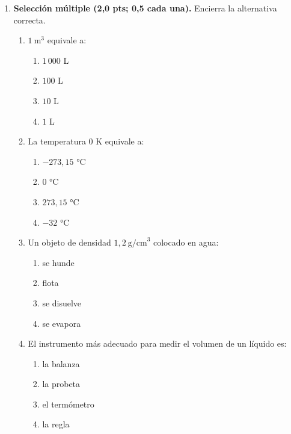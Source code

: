 \documentclass[12pt, letterpaper]{article}
\begin{document}
\begin{enumerate}[leftmargin=*, label=\textbf{\arabic*.}, itemsep=0.5em]

  \item \textbf{Selección múltiple (2,0 pts; 0,5 cada una).} Encierra la alternativa correcta.
        \begin{enumerate}[label=\alph*), leftmargin=1.8em, itemsep=0.25em]
          \item $1\ \text{m}^3$ equivale a:
                \begin{enumerate}[label=\Alph*), leftmargin=1.6em, itemsep=0pt, topsep=2pt]
                  \item $1\,000$ L
                  \item $100$ L
                  \item $10$ L
                  \item $1$ L
                \end{enumerate}
          \item La temperatura $0$ K equivale a:
                \begin{enumerate}[label=\Alph*), leftmargin=1.6em, itemsep=0pt, topsep=2pt]
                  \item $-273{,}15$ °C
                  \item $0$ °C
                  \item $273{,}15$ °C
                  \item $-32$ °C
                \end{enumerate}
          \item Un objeto de densidad $1{,}2\ \text{g/cm}^3$ colocado en agua:
                \begin{enumerate}[label=\Alph*), leftmargin=1.6em, itemsep=0pt, topsep=2pt]
                  \item se hunde
                  \item flota
                  \item se disuelve
                  \item se evapora
                \end{enumerate}
          \item El instrumento más adecuado para medir el volumen de un líquido es:
                \begin{enumerate}[label=\Alph*), leftmargin=1.6em, itemsep=0pt, topsep=2pt]
                  \item la balanza
                  \item la probeta
                  \item el termómetro
                  \item la regla
                \end{enumerate}
        \end{enumerate}


\end{enumerate}
\end{document}
